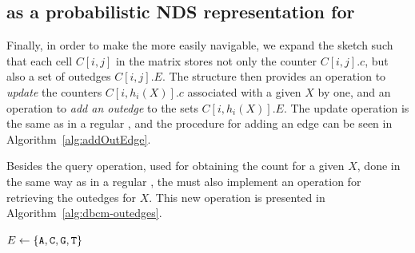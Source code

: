 
\subsection{\cm as a probabilistic NDS representation for }
\label{subsubsec:cm-dbg}

Finally, in order to make the \cm more easily navigable, we expand the sketch such that each cell $C[i,j]$ in the matrix stores not only the counter $C[i,j].c$, but also a set of outedges $C[i,j].E$. The structure then provides an operation to \emph{update} the counters $C[i,h_i(X)].c$ associated with a given \kmer $X$ by one, and an operation to \emph{add an outedge} to the sets $C[i,h_i(X)].E$. The update operation is the same as in a regular \cm, and the procedure for adding an edge can be seen in Algorithm~\ref{alg:addOutEdge}.


\begin{algorithm}[htbp]
    \caption{$C.\mathit{add\_outedge}(X, a)$}\label{alg:addOutEdge}
\end{algorithm}

Besides the query operation, used for obtaining the count for a given \kmer $X$, done in the same way as in a regular \cm, the \dBCM must also implement an operation for retrieving the outedges for $X$. This new operation is presented in Algorithm~\ref{alg:dbcm-outedges}.

\begin{algorithm}
	\caption{$C.\mathit{outedges}(X)$}\label{alg:dbcm-outedges}
	$E \gets \{\mathtt{A}, \mathtt{C}, \mathtt{G}, \mathtt{T}\}$\\
\end{algorithm}

